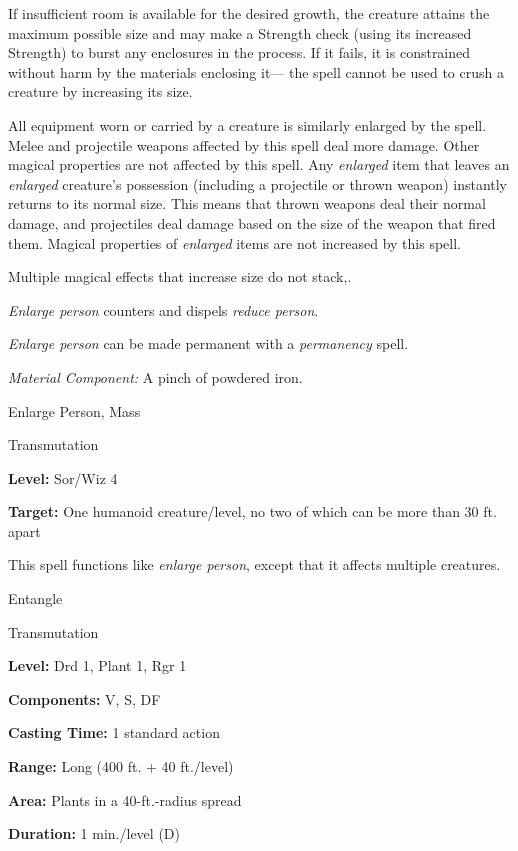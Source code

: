\documentclass{article}
\begin{document}
If insufficient room is available for the desired growth, the creature attains 
the maximum possible size and may make a Strength check (using its increased Strength) 
to burst any enclosures in the process. If it fails, it is constrained without 
harm by the materials enclosing it--- the spell cannot be used to crush a creature 
by increasing its size.

All equipment worn or carried by a creature is similarly enlarged by the spell. 
Melee and projectile weapons affected by this spell deal more damage. Other magical 
properties are not affected by this spell. Any \textit{enlarged }item that leaves 
an \textit{enlarged }creature's possession (including a projectile or thrown weapon) 
instantly returns to its normal size. This means that thrown weapons deal their 
normal damage, and projectiles deal damage based on the size of the weapon that 
fired them. Magical properties of \textit{enlarged }items are not increased by 
this spell.

Multiple magical effects that increase size do not stack,.

\textit{Enlarge person }counters and dispels \textit{reduce person}.

\textit{Enlarge person }can be made permanent with a \textit{permanency }spell.

\textit{Material Component: }A pinch of powdered iron.

\vspace{12pt}
Enlarge Person, Mass

Transmutation

\textbf{Level:} Sor/Wiz 4

\textbf{Target:} One humanoid creature/level, no two of which can be more than 
30 ft. apart

This spell functions like \textit{enlarge person}, except that it affects multiple 
creatures.

\vspace{12pt}
Entangle

Transmutation

\textbf{Level:} Drd 1, Plant 1, Rgr 1

\textbf{Components:} V, S, DF

\textbf{Casting Time:} 1 standard action

\textbf{Range:} Long (400 ft. + 40 ft./level)

\textbf{Area:} Plants in a 40-ft.-radius spread

\textbf{Duration:} 1 min./level (D)
\end{document}
